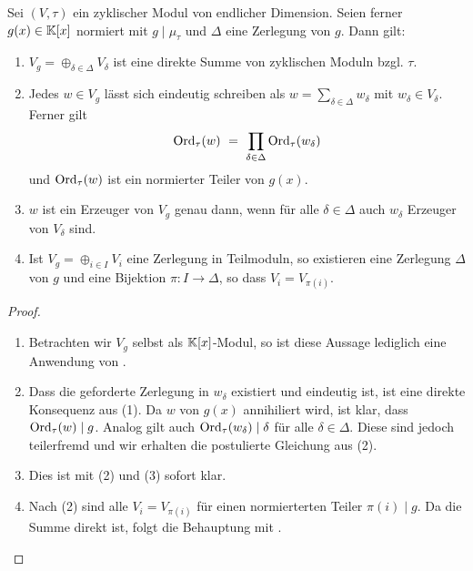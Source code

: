 \begin{satz}
  \label{satz:zerlegungssatz_zykl_vektorraume}
  Sei $(V,\tau)$ ein zyklischer Modul von endlicher Dimension. Seien ferner 
  $g(x) \in \mathbb{K}[x]$ normiert mit $g\mid \mu_\tau$ und $\Delta$ eine 
  Zerlegung von $g$. Dann gilt:
  \begin{enumerate}
    \item $V_g = \oplus_{\delta\in\Delta} V_\delta$ ist eine direkte Summe 
      von zyklischen Moduln bzgl. $\tau$.
    \item Jedes $w \in V_g$ lässt sich eindeutig schreiben als 
      $w = \sum_{\delta\in\Delta} w_\delta$ mit $w_\delta \in V_\delta$. Ferner
      gilt 
      \[ \operatorname{Ord}_\tau(w) \ =\  \prod_{\delta\in \Delta} \operatorname{Ord}_\tau(w_\delta)\]
      und $\operatorname{Ord}_\tau(w)$ ist ein normierter Teiler von $g(x)$.
    \item $w$ ist ein Erzeuger von $V_g$ genau dann, wenn für alle 
      $\delta\in\Delta$ auch $w_\delta$ Erzeuger von $V_\delta$ sind.
    \item Ist $V_g = \oplus_{i \in I} V_i$ eine Zerlegung in Teilmoduln,
      so existieren eine Zerlegung $\Delta$ von $g$ und 
      eine Bijektion $\pi:I\to\Delta$, so dass $V_i = V_{\pi(i)}$.
  \end{enumerate}
\end{satz}
\begin{proof}
  \begin{enumerate}
    \item Betrachten wir $V_g$ selbst als $\mathbb{K}[x]$-Modul, so ist diese Aussage
      lediglich eine Anwendung von .
    \item Dass die geforderte Zerlegung in $w_\delta$ existiert und eindeutig
      ist, ist eine direkte Konsequenz aus (1). Da $w$ von $g(x)$ annihiliert
      wird, ist klar, dass $\operatorname{Ord}_\tau(w) \mid g$. Analog gilt auch
      $\operatorname{Ord}_\tau(w_\delta)\mid \delta$ für alle $\delta \in \Delta$. Diese sind
      jedoch teilerfremd und wir erhalten die postulierte Gleichung aus
       (2).
    \item Dies ist mit (2) und  (3) sofort klar.
    \item Nach  (2) sind alle $V_i = V_{\pi(i)}$
      für einen normierterten Teiler $\pi(i) \mid g$. Da die Summe direkt ist,
      folgt die Behauptung mit .
  \end{enumerate}
\end{proof}


